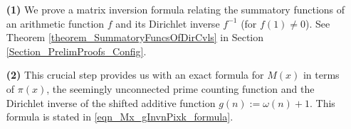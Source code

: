 \documentclass[11pt,reqno,a4letter]{article}
\numberwithin{figure}{section}
\numberwithin{table}{section}
\theoremstyle{plain}
\numberwithin{theorem}{section}
\theoremstyle{definition}
\begin{document}
\begin{itemize} 

\item[\textbf{(1)}] We prove a matrix inversion formula relating the summatory 
           functions of an arithmetic function $f$ and its Dirichlet inverse $f^{-1}$ (for $f(1) \neq 0$). 
           See 
           Theorem \ref{theorem_SummatoryFuncsOfDirCvls} in 
           Section \ref{Section_PrelimProofs_Config}.  
\item[\textbf{(2)}] This crucial step provides us with an exact formula for $M(x)$ in terms of $\pi(x)$, the seemingly 
           unconnected prime counting function and the 
           Dirichlet inverse of the shifted additive function $g(n) := \omega(n) + 1$. This 
           formula is stated in \eqref{eqn_Mx_gInvnPixk_formula}. 
           

\end{itemize}
\end{document}
